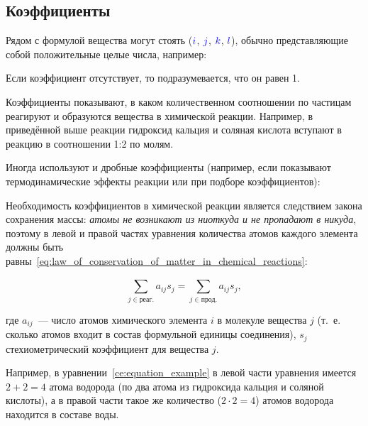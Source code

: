 
\subsection*{Коэффициенты}

Рядом с формулой вещества могут стоять  ($\textcolor{blue}{i}$, $\textcolor{blue}{j}$, $\textcolor{blue}{k}$, $\textcolor{blue}{l}$), обычно представляющие собой положительные целые числа, например:


Если коэффициент отсутствует, то подразумевается, что он равен 1.

Коэффициенты показывают, в каком количественном соотношении по частицам реагируют и образуются вещества в химической реакции. Например, в приведённой выше реакции гидроксид кальция и соляная кислота вступают в реакцию в соотношении 1:2 по молям.

Иногда используют и дробные коэффициенты (например, если показывают термодинамические эффекты реакции или при подборе коэффициентов):


Необходимость коэффициентов в химической реакции является следствием закона сохранения массы: \emph{атомы не возникают из ниоткуда и не пропадают в никуда}, поэтому в левой и правой частях уравнения количества атомов каждого элемента должны быть равны~\eqref{eq:law_of_conservation_of_matter_in_chemical_reactions}:

\begin{equation}
    \label{eq:law_of_conservation_of_matter_in_chemical_reactions}
    \sum_{j \in \text{реаг.}}^{}a_{ij}s_j = \sum_{j \in \text{прод.}}^{}a_{ij}s_j,
\end{equation}

где $a_{ij}$~--- число атомов химического элемента $i$ в молекуле вещества $j$ (т.~е. сколько атомов входит в состав формульной единицы соединения), $s_j$ стехиометрический коэффициент для вещества $j$.

Например, в уравнении~\eqref{ce:equation_example} в левой части уравнения имеется $2 + 2 = 4$ атома водорода (по два атома из гидроксида кальция и соляной кислоты), а в правой части такое же количество ($2 \cdot 2 = 4$) атомов водорода находится в составе воды.

